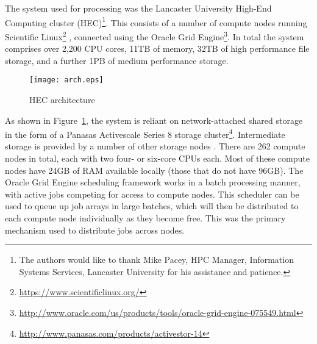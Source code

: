 The system used for processing was the Lancaster University High-End Computing cluster (HEC)\footnote{The authors would like to thank Mike Pacey, HPC Manager, Information Systems Services, Lancaster University for his assistance and patience.}.  This consists of a number of compute nodes running Scientific Linux\footnote{\url{https://www.scientificlinux.org/}}%
, connected using the Oracle Grid Engine\footnote{\url{http://www.oracle.com/us/products/tools/oracle-grid-engine-075549.html}}.  
In total the system comprises over 2,200 CPU cores, 11TB of memory, 32TB of high performance file storage, and a further 1PB of medium performance storage.


\begin{figure}[h]
    \centering
    \texttt{[image: arch.eps]}
    \caption{HEC architecture}
    \label{fig:arch}
\end{figure}

As shown in Figure~\ref{fig:arch}, the system is reliant on network-attached shared storage in the form of a Panasas Activescale Series 8 storage cluster\footnote{\url{http://www.panasas.com/products/activestor-14}}\cite{Nagle2004PAS1048933.1049998}.  Intermediate storage is provided by a number of other storage nodes .
There are 262 compute nodes in total, each with two four- or six-core CPUs  each.  Most of these compute nodes have 24GB of RAM available locally (those that do not have 96GB).
The Oracle Grid Engine scheduling framework works in a batch processing manner, with active jobs competing for access to compute nodes.  This scheduler can be used to queue up job arrays in large batches, which will then be distributed to each compute node individually as they become free.  This was the primary mechanism used to distribute jobs across nodes.

